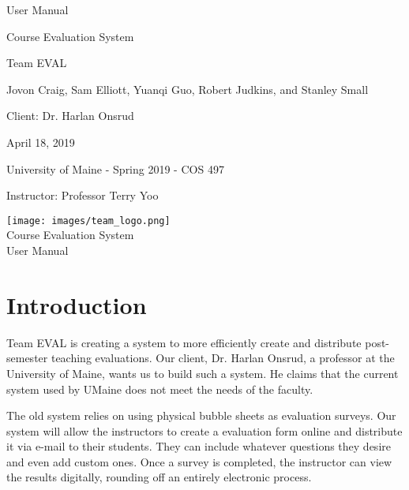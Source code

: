 \documentclass{article}
\begin{document}
\begin{titlepage}

\centering
\vspace*{2cm}
{\Huge User Manual\par}
\vspace{.25cm}
{\LARGE Course Evaluation System\par}
\vspace{1cm}
{\Large Team EVAL\par}
\vspace{.2cm}
{\Large Jovon Craig, Sam Elliott, Yuanqi Guo, Robert Judkins, and Stanley Small\par}
\vspace{1cm}
{\Large Client: Dr. Harlan Onsrud\par}
\vspace{1cm}
{\Large April 18, 2019\par}
\vspace{11cm}

University of Maine - Spring 2019 - COS 497

Instructor: Professor Terry Yoo

\end{titlepage}

\newpage

\begin{center}
{\texttt{[image: images/team\_logo.png]}} \\ 	\bigskip
{\LARGE Course Evaluation System } \\ \medskip
{\large User Manual } \\ \medskip
\end{center}

\tableofcontents

\newpage

\section{Introduction}

Team EVAL is creating a system to more efficiently create and distribute post-semester teaching evaluations. Our client, Dr. Harlan Onsrud, a professor at the University of Maine, wants us to build such a system. He claims that the current system used by UMaine does not meet the needs of the faculty.

The old system relies on using physical bubble sheets as evaluation surveys. Our system will allow the instructors to create a evaluation form online and distribute it via e-mail to their students. They can include whatever questions they desire and even add custom ones. Once a survey is completed, the instructor can view the results digitally, rounding off an entirely electronic process.
  
\end{document}
